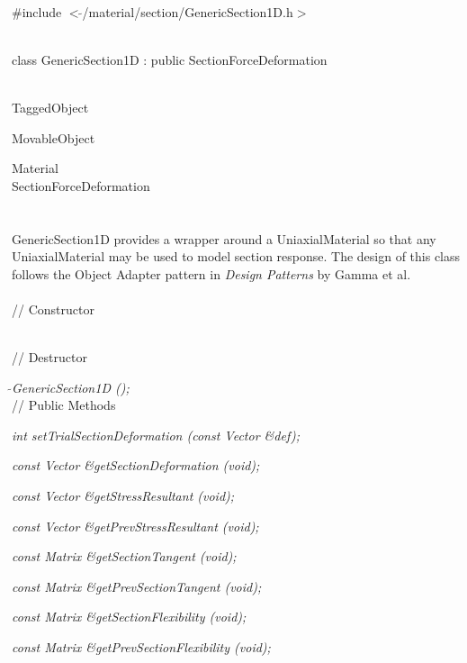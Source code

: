
   \\
\#include $<\tilde{ }$/material/section/GenericSection1D.h$>$  


  \\
class GenericSection1D : public SectionForceDeformation 


 \\
TaggedObject 

MovableObject 

\indent\indent Material \\
\indent\indent\indent SectionForceDeformation \\
\indent\indent\indent{} \\

  \\
\indent GenericSection1D provides a wrapper around a UniaxialMaterial
so that any UniaxialMaterial may be used to model section response. 
The design of this class follows the Object Adapter pattern in 
{\em Design Patterns} by Gamma et al.\\

 \\
// Constructor 

 \\
// Destructor 

{\em $\tilde{ }$GenericSection1D ();}\\ 

// Public Methods 

{\em int setTrialSectionDeformation (const Vector \&def); } 

{\em const Vector \&getSectionDeformation (void); } 

{\em const Vector \&getStressResultant (void); } 

{\em const Vector \&getPrevStressResultant (void); } 

{\em const Matrix \&getSectionTangent (void); } 

{\em const Matrix \&getPrevSectionTangent (void); } 

{\em const Matrix \&getSectionFlexibility (void); } 

{\em const Matrix \&getPrevSectionFlexibility (void); } 

